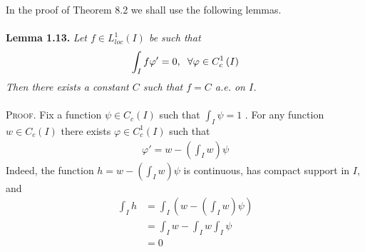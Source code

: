 \documentclass[a4paper,oneside]{article}
\numberwithin{equation}{section}
\begin{document}
In the proof of Theorem 8.2 we shall use the following lemmas.\\
\\
\textbf{Lemma 1.13.} \textit{Let $f\in L_{loc}^1\left(I\right)$ be such that}
\begin{align}
\label{1.65}
\int_I {f\varphi '}  = 0,\hspace{0.2cm}\forall \varphi  \in C_c^1\left( I \right)
\end{align}
\textit{Then there exists a constant $C$ such that $f=C$ a.e. on $I$.}\\
\\
\textsc{Proof.} Fix a function $\psi  \in {C_c}\left( I \right)$ such that $\int_I \psi   = 1$ . For any function $w\in C_c\left(I\right)$ there exists $\varphi \in C_c^1\left(I\right)$ such that
\begin{align}
\varphi ' = w - \left( {\int_I w } \right)\psi 
\end{align}
Indeed, the function $h=w - \left( {\int_I w } \right)\psi $ is continuous, has compact support in $I$, and
\begin{align}
\int_I h  &= \int_I {\left( {w - \left( {\int_I w } \right)\psi } \right)} \\
& = \int_I w  - \int_I w \int_I \psi  \\
& = 0
\end{align}
\end{document}
